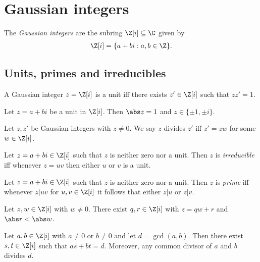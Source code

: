 \documentclass{article}
\begin{document}
\section{Gaussian integers}

\begin{definition}
	The \emph{Gaussian integers} are the subring $\Z[i]\subseteq\C$ given by
	\begin{align*}
		\Z[i]=\{a+bi:a,b\in\Z\}.
	\end{align*}
\end{definition}

\subsection{Units, primes and irreducibles}

\begin{definition}
	A Gaussian integer $z=\Z[i]$ is a unit iff there exists $z'\in\Z[i]$ such that
	$zz'=1$.
\end{definition}

\begin{lemma}[Lecture 13]
	Let $z=a+bi$ be a unit in $\Z[i]$. Then $\abs z=1$ and $z\in\{\pm 1, \pm i\}$.
\end{lemma}

\begin{definition}
	Let $z,z'$ be Gaussian integers with $z\not=0$. We say $z$ divides $z'$ iff $z'=zw$ for
	some $w\in\Z[i]$.
\end{definition}

\begin{definition}[Irreducibles]
	Let $z=a+bi\in\Z[i]$ such that $z$ is neither zero nor a unit. Then $z$ is \emph{irreducible}
	iff whenever $z=uv$ then either $u$ or $v$ is a unit.
\end{definition}

\begin{definition}
	Let $z=a+bi\in\Z[i]$ such that $z$ is neither zero nor a unit. Then $z$ is \emph{prime} iff
	whenever $z|uv$ for $u,v\in\Z[i]$ it follows that either $z|u$ or $z|v$.
\end{definition}

\begin{theorem}
	Let $z,w\in\Z[i]$ with $w\not=0$. There exist $q,r\in\Z[i]$ with $z=qw+r$ and $\abs r<\abs w$.
\end{theorem}

\begin{theorem}
	Let $a,b\in\Z[i]$ with $a\not=0$ or $b\not=0$ and let $d=\gcd(a,b)$. Then there exist $s,t\in\Z[i]$
	such that $as+bt=d$. Moreover, any common divisor of $a$ and $b$ divides $d$.
\end{theorem}
\end{document}

